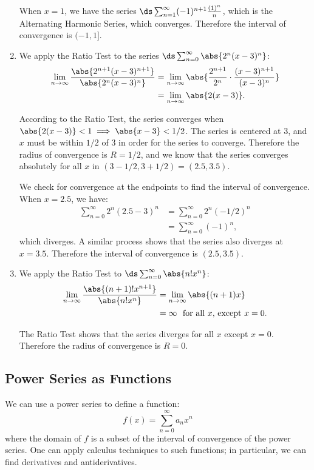 \begin{example}
\begin{enumerate}
	When $x=1$, we have the series $\ds \sum_{n=1}^\infty (-1)^{n+1}\frac{(1)^n}{n}$, which is the Alternating Harmonic Series, which converges. Therefore the interval of convergence is $(-1,1]$.
	
	\item		We apply the Ratio Test to the series $\ds\sum_{n=0}^\infty \abs{2^n(x-3)^n}$:
	\begin{align*}
	\lim_{n\to\infty} \frac{\abs{2^{n+1}(x-3)^{n+1}}}{\abs{2^n(x-3)^n}} &= \lim_{n\to\infty} \abs{\frac{2^{n+1}}{2^n}\cdot\frac{(x-3)^{n+1}}{(x-3)^n}}\\
			&=\lim_{n\to\infty} \abs{2(x-3)}.
	\end{align*}
	
According to the Ratio Test, the series converges when $\abs{2(x-3)}<1 \implies \abs{x-3}< 1/2$. The series is centered at 3, and $x$ must be within $1/2$ of 3 in order for the series to converge. Therefore the radius of convergence is $R=1/2$, and we know that the series converges absolutely for all $x$ in $(3-1/2,3+1/2) = (2.5, 3.5)$.

We check for convergence at the endpoints to find the interval of convergence. When $x=2.5$, we have:
\begin{align*}
\sum_{n=0}^\infty 2^n(2.5-3)^n &= \sum_{n=0}^\infty 2^n(-1/2)^n \\
			&=\sum_{n=0}^\infty (-1)^n,
\end{align*}
which diverges. A similar process shows that the series also diverges at $x=3.5$. Therefore the interval of convergence is $(2.5, 3.5)$.

\item		We apply the Ratio Test to $\ds \sum_{n=0}^\infty \abs{n!x^n}$:
\begin{align*}
\lim_{n\to\infty} \frac{\abs{ (n+1)!x^{n+1}}}{\abs{n!x^n}} &= \lim_{n\to\infty} \abs{(n+1)x}\\
		&= \infty\ \text{ for all $x$, except $x=0$.}
\end{align*}

The Ratio Test shows that the series diverges for all $x$ except $x=0$. Therefore the radius of convergence is $R=0$.
\end{enumerate}
\end{example}

\subsection{Power Series as Functions}

We can use a power series to define a function:
\[f(x) = \sum_{n=0}^\infty a_nx^n\]
where the domain of $f$ is a subset of the interval of convergence of the power series. One can apply calculus techniques to such functions; in particular, we can find derivatives and antiderivatives. 

